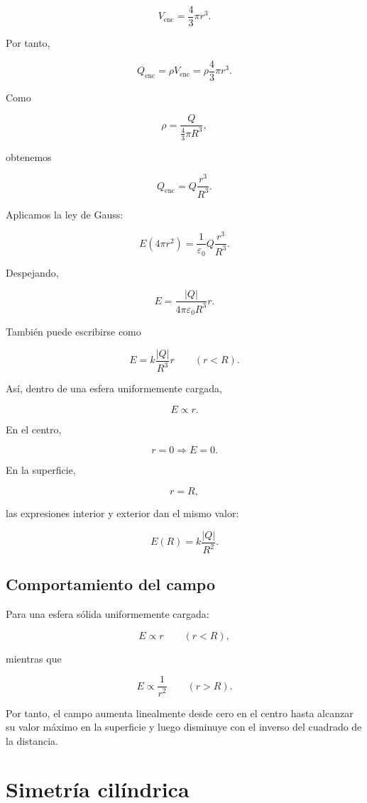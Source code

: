 \[
V_{\text{enc}}=\frac43\pi r^3.
\]

Por tanto,

\[
Q_{\text{enc}}=\rho V_{\text{enc}}
=\rho\frac43\pi r^3.
\]

Como

\[
\rho=\frac{Q}{\frac43\pi R^3},
\]

obtenemos

\[
Q_{\text{enc}}=Q\frac{r^3}{R^3}.
\]

Aplicamos la ley de Gauss:

\[
E(4\pi r^2)
=
\frac{1}{\varepsilon_0}
Q\frac{r^3}{R^3}.
\]

Despejando,

\[
\boxed{
E=
\frac{|Q|}{4\pi\varepsilon_0R^3}r
}.
\]

También puede escribirse como

\begin{equation}
\boxed{
E=k\frac{|Q|}{R^3}r
\qquad(r<R)
}.
\label{eq:campo_esfera_uniforme_interior}
\end{equation}

Así, dentro de una esfera uniformemente cargada,

\[
\boxed{E\propto r}.
\]

En el centro,

\[
r=0
\Longrightarrow
\boxed{E=0}.
\]

En la superficie,

\[
r=R,
\]

las expresiones interior y exterior dan el mismo valor:

\[
E(R)=k\frac{|Q|}{R^2}.
\]


\subsection{Comportamiento del campo}

Para una esfera sólida uniformemente cargada:

\[
E\propto r
\qquad
(r<R),
\]

mientras que

\[
E\propto\frac{1}{r^2}
\qquad
(r>R).
\]

Por tanto, el campo aumenta linealmente desde cero en el centro hasta alcanzar su
valor máximo en la superficie y luego disminuye con el inverso del cuadrado de la
distancia.


\section{Simetría cilíndrica}

